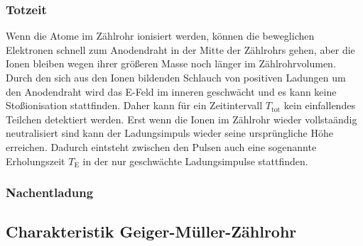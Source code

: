 \subsubsection{Totzeit}
Wenn die Atome im Zählrohr ionisiert werden, können die beweglichen Elektronen schnell zum Anodendraht in der Mitte der Zählrohrs gehen, aber die Ionen bleiben wegen ihrer größeren Masse noch länger im Zählrohrvolumen.
Durch den sich aus den Ionen bildenden Schlauch von positiven Ladungen um den Anodendraht wird das E-Feld im inneren geschwächt und es kann keine Stoßionisation stattfinden.
Daher kann für ein Zeitintervall $T_{\text{tot}}$ kein einfallendes Teilchen detektiert werden.
Erst wenn die Ionen im Zählrohr wieder vollstaändig neutralisiert sind kann der Ladungsimpuls wieder seine ursprüngliche Höhe erreichen.
Dadurch eintsteht zwischen den Pulsen auch eine sogenannte Erholungszeit $T_{\text{E}}$ in der nur geschwächte Ladungsimpulse stattfinden.
\subsubsection{Nachentladung}
\label{sec:Nachentladung}
\subsection{Charakteristik Geiger-Müller-Zählrohr}
